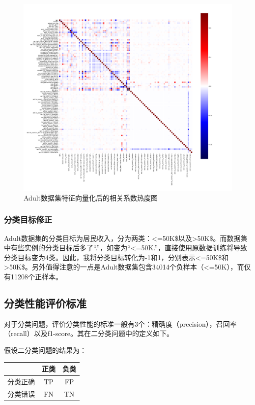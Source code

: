 \documentclass[12pt,a4paper]{article}
\theoremstyle{definition}
\begin{document}
{\begin{figure}[H]
	\centering
	\includegraphics[width=0.85\linewidth]{img/cof_heat2.png}
	\caption{Adult数据集特征向量化后的相关系数热度图}
	\label{fig:heat3}
\end{figure}

\subsubsection{分类目标修正}
\label{sec:fix-target}

Adult数据集的分类目标为居民收入，分为两类：<=50K\$以及>50K\$。而数据集中有些实例的分类目标后多了“.”，如变为“<=50K.”，直接使用原数据训练将导致分类目标变为4类。因此，我将分类目标转化为-1和1，分别表示<=50K\$和>50K\$。另外值得注意的一点是Adult数据集包含34014个负样本（<=50K），而仅有11208个正样本。

\subsection{分类性能评价标准}

对于分类问题，评价分类性能的标准一般有3个：精确度（precision），召回率（recall）以及f1-score。其在二分类问题中的定义如下。

假设二分类问题的结果为：


\begin{table}[H]
	\centering
	\begin{tabular}{c|c|c}
		& 正类 &  负类 \\
		\hline
		\hline
	
		 分类正确 & TP & FP \\
		 分类错误 & FN & TN \\
	\end{tabular}
\end{table}

}
\end{document}
